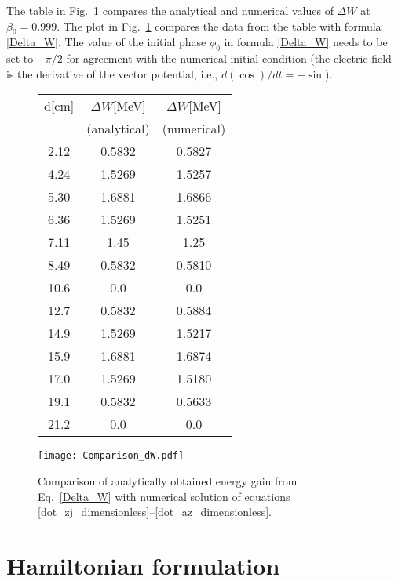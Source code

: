 \documentclass[11pt]{article}
\begin{document}
The table in Fig.~\ref{Fig_Delta_W} compares the analytical and numerical values of $\Delta W$ at $\beta_0=0.999$. 
The plot in Fig.~\ref{Fig_Delta_W} compares the data from the table with formula \eqref{Delta_W}. 
The value of the initial phase $\phi_0$ in formula \eqref{Delta_W} needs to be set to $-\pi/2$ for agreement with 
the numerical initial condition (the electric field is the derivative of the vector potential, i.e., $d(\cos)/dt = -\sin$).
%


\begin{figure}[h]
\begin{minipage}{3in}
\hspace{0.5cm}
\begin{tabular}{c|c|c}
d[cm] & $\Delta W$[MeV] & $\Delta W$[MeV] \\
 & (analytical)  & (numerical) \\
\hline
2.12 & 0.5832 & 0.5827 \\
4.24 & 1.5269 & 1.5257 \\ 
5.30 & 1.6881 & 1.6866 \\
6.36 & 1.5269 & 1.5251 \\
7.11 & 1.45   & 1.25   \\
8.49 & 0.5832 & 0.5810 \\
10.6 & 0.0    & 0.0    \\
12.7 & 0.5832 & 0.5884 \\
14.9 & 1.5269 & 1.5217 \\
15.9 & 1.6881 & 1.6874 \\
17.0 & 1.5269 & 1.5180 \\
19.1 & 0.5832 & 0.5633 \\
21.2 & 0.0    & 0.0 \\
\hline
\end{tabular}
\end{minipage}
\hspace{-1cm}
\begin{minipage}{5in}
\texttt{[image: Comparison\_dW.pdf]}
\end{minipage}
\caption{Comparison of analytically obtained energy gain from Eq.~\eqref{Delta_W} with numerical solution of
equations \eqref{dot_zj_dimensionless}--\eqref{dot_az_dimensionless}.}
\label{Fig_Delta_W}
\end{figure}


\newpage
\section{Hamiltonian formulation}
\label{Hamiltonian_formulation}
\end{document}
